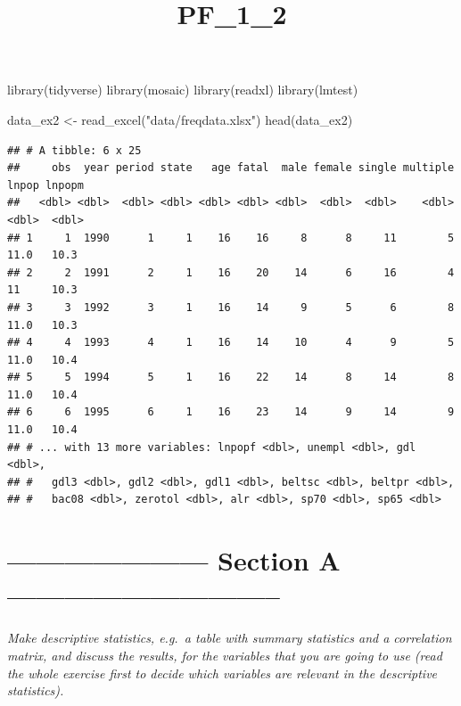 \documentclass[
]{article}
\title{PF\_1\_2}
\author{}
\date{\vspace{-2.5em}}
\newenvironment{Shaded}{\begin{snugshade}}{\end{snugshade}}
\newcommand{\FunctionTok}[1]{\textcolor[rgb]{0.00,0.00,0.00}{#1}}
\newcommand{\NormalTok}[1]{#1}
\newcommand{\OtherTok}[1]{\textcolor[rgb]{0.56,0.35,0.01}{#1}}
\newcommand{\StringTok}[1]{\textcolor[rgb]{0.31,0.60,0.02}{#1}}
\begin{document}
\maketitle

\begin{Shaded}
\begin{Highlighting}[]
\FunctionTok{library}\NormalTok{(tidyverse)}
\FunctionTok{library}\NormalTok{(mosaic)}
\FunctionTok{library}\NormalTok{(readxl)}
\FunctionTok{library}\NormalTok{(lmtest)}
\end{Highlighting}
\end{Shaded}

\begin{Shaded}
\begin{Highlighting}[]
\NormalTok{data\_ex2 }\OtherTok{\textless{}{-}} \FunctionTok{read\_excel}\NormalTok{(}\StringTok{"data/freqdata.xlsx"}\NormalTok{)}
\FunctionTok{head}\NormalTok{(data\_ex2)}
\end{Highlighting}
\end{Shaded}

\begin{verbatim}
## # A tibble: 6 x 25
##     obs  year period state   age fatal  male female single multiple lnpop lnpopm
##   <dbl> <dbl>  <dbl> <dbl> <dbl> <dbl> <dbl>  <dbl>  <dbl>    <dbl> <dbl>  <dbl>
## 1     1  1990      1     1    16    16     8      8     11        5  11.0   10.3
## 2     2  1991      2     1    16    20    14      6     16        4  11     10.3
## 3     3  1992      3     1    16    14     9      5      6        8  11.0   10.3
## 4     4  1993      4     1    16    14    10      4      9        5  11.0   10.4
## 5     5  1994      5     1    16    22    14      8     14        8  11.0   10.4
## 6     6  1995      6     1    16    23    14      9     14        9  11.0   10.4
## # ... with 13 more variables: lnpopf <dbl>, unempl <dbl>, gdl <dbl>,
## #   gdl3 <dbl>, gdl2 <dbl>, gdl1 <dbl>, beltsc <dbl>, beltpr <dbl>,
## #   bac08 <dbl>, zerotol <dbl>, alr <dbl>, sp70 <dbl>, sp65 <dbl>
\end{verbatim}

\hypertarget{section-a}{%
\section{--------------------- Section A
-----------------------------}\label{section-a}}

\emph{Make descriptive statistics, e.g.~a table with summary statistics
and a correlation matrix, and discuss the results, for the variables
that you are going to use (read the whole exercise first to decide which
variables are relevant in the descriptive statistics).}
\end{document}
